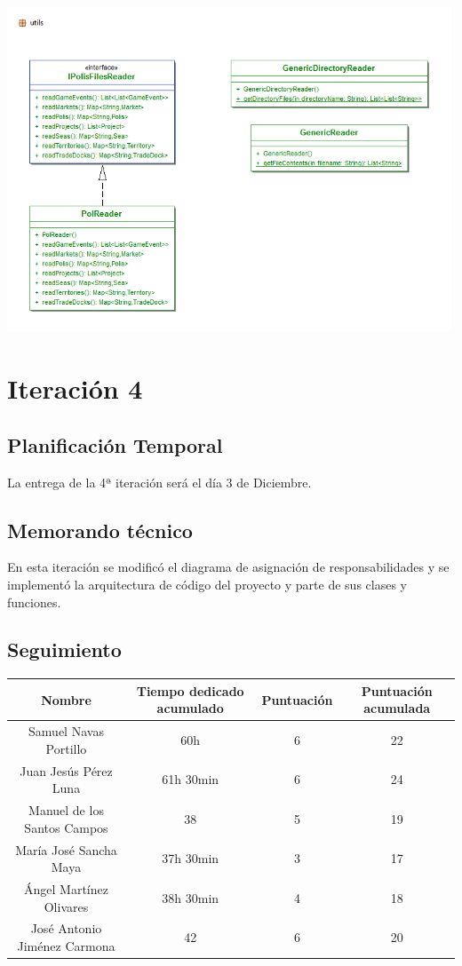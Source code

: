 \documentclass[11 pt]{book}
\begin{document}
\begin{center}
		    \includegraphics[width=500px]{design-uml/iteration3/package-utils.png}
		\end{center}
		
\chapter{Iteración 4}
	\section{Planificación Temporal}
		La entrega de la 4ª iteración será el día 3 de Diciembre.

	\section{Memorando técnico}
		En esta iteración se modificó el diagrama de asignación de responsabilidades y se implementó la arquitectura de código del proyecto y parte de sus clases y funciones.
		
	\section{Seguimiento}
		\begin{tabular}{|c|c|c|c|}
			\hline
			Nombre & Tiempo dedicado acumulado & Puntuación & Puntuación acumulada\\
			\hline
			Samuel Navas Portillo & 60h & 6 & 22\\
			Juan Jesús Pérez Luna & 61h 30min & 6 & 24\\
			Manuel de los Santos Campos & 38 & 5 & 19\\
			María José Sancha Maya & 37h 30min & 3 & 17\\
			Ángel Martínez Olivares & 38h 30min & 4 & 18\\
			José Antonio Jiménez Carmona & 42 & 6 & 20\\
			\hline
		\end{tabular}
\end{document}
